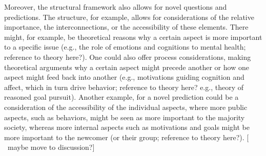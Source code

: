 \documentclass[man, 12pt, a4paper]{apa7}
\newcommand\Warning[1][2ex]{%
  \renewcommand\stacktype{L}%
  \scaleto{\stackon[1.3pt]{\color{red}$\triangle$}{\tiny\bfseries !}}{#1}}%
\begin{document}
\vspace{1em}
Moreover, the structural framework also allows for novel questions and predictions. The structure, for example, allows for considerations of the relative importance, the interconnections, or the accessibility of these elements. There might, for example, be theoretical reasons why a certain aspect is more important to a specific issue (e.g., the role of emotions and cognitions to mental health; reference to theory here?). One could also offer process considerations, making theoretical arguments why a certain aspect might precede another or how one aspect might feed back into another (e.g., motivations guiding cognition and affect, which in turn drive behavior; reference to theory here? e.g., theory of reasoned goal pursuit). Another example, for a novel prediction could be a consideration of the accessibility of the individual aspects, where more public aspects, such as behaviors, might be seen as more important to the majority society, whereas more internal aspects such as motivations and goals might be more important to the newcomer (or their group; reference to theory here?). [\Warning\ maybe move to discussion?]
\end{document}
